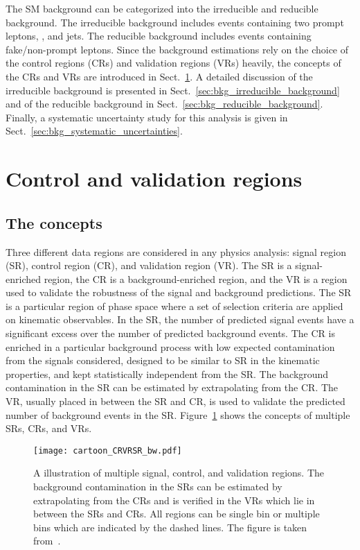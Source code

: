 The SM background can be categorized into the irreducible and reducible background.
The irreducible background includes events containing two prompt leptons, \met, and jets.
The reducible background includes events containing fake/non-prompt leptons.
Since the background estimations rely on the choice of the control regions (CRs) and validation regions (VRs) heavily, the concepts of the CRs and VRs are introduced in Sect.~\ref{sec:bkg_control_and_validation_regions}.
A detailed discussion of the irreducible background is presented in Sect.~\ref{sec:bkg_irreducible_background} and of the reducible background in Sect.~\ref{sec:bkg_reducible_background}.
Finally, a systematic uncertainty study for this analysis is given in Sect.~\ref{sec:bkg_systematic_uncertainties}.


\section{Control and validation regions}
\label{sec:bkg_control_and_validation_regions}


\subsection{The concepts}
\label{subsec:bkg_SRs_CRs_VRs_concepts}
Three different data regions are considered in any physics analysis: signal region (SR), control region (CR), and validation region (VR).
The SR is a signal-enriched region, the CR is a background-enriched region, and the VR is a region used to validate the robustness of the signal and background predictions.
The SR is a particular region of phase space where a set of selection criteria are applied on kinematic observables.
In the SR, the number of predicted signal events have a significant excess over the number of predicted background events.
The CR is enriched in a particular background process with low expected contamination from the signals considered, designed to be similar to SR in the kinematic properties, and kept statistically independent from the SR.
The background contamination in the SR can be estimated by extrapolating from the CR.
The VR, usually placed in between the SR and CR, is used to validate the predicted number of background events in the SR.
Figure~\ref{fig:bkg_SRs_CRs_VRs} shows the concepts of multiple SRs, CRs, and VRs.

\begin{figure}[htbp]
    \begin{center}
        \texttt{[image: cartoon\_CRVRSR\_bw.pdf]}
        \caption{A illustration of multiple signal, control, and validation regions.
        The background contamination in the SRs can be estimated by extrapolating from the CRs and is verified in the VRs which lie in between the SRs and CRs.
        All regions can be single bin or multiple bins which are indicated by the dashed lines.
        The figure is taken from~\cite{Baak:2014wma}.}
        \label{fig:bkg_SRs_CRs_VRs}
    \end{center}
\end{figure}

